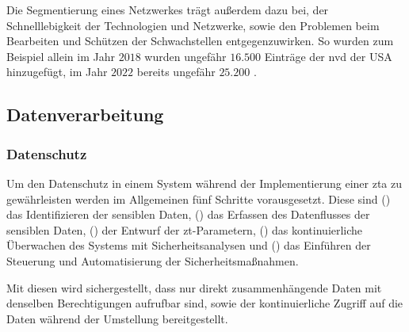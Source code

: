 Die Segmentierung eines Netzwerkes trägt außerdem dazu bei, der Schnelllebigkeit der Technologien und Netzwerke, sowie den Problemen beim Bearbeiten und Schützen der Schwachstellen entgegenzuwirken.
So wurden zum Beispiel allein im Jahr $2018$ wurden ungefähr $16.500$ Einträge der \ac{nvd} der USA hinzugefügt, im Jahr $2022$ bereits ungefähr $25.200$ \autocites[\vglf][]{cunningham-2019}[\vglf][]{cve-2023}.

\subsection{Datenverarbeitung}\label{subsec:datenverarbeitung}
\subsubsection{Datenschutz}\label{subsubsec:datenschutz}
Um den Datenschutz in einem System während der Implementierung einer \ac{zta} zu gewährleisten werden im Allgemeinen fünf Schritte vorausgesetzt.
Diese sind () das Identifizieren der sensiblen Daten, () das Erfassen des Datenflusses der sensiblen Daten, () der Entwurf der \ac{zt}-Parametern, () das kontinuierliche Überwachen des Systems mit Sicherheitsanalysen und () das Einführen der Steuerung und Automatisierung der Sicherheitsmaßnahmen.\autocites[\vglf][-3]{ahmed-2020}[\vglf][]{balaouras-2023}

Mit diesen wird sichergestellt, dass nur direkt zusammenhängende Daten mit denselben Berechtigungen aufrufbar sind, sowie der kontinuierliche Zugriff auf die Daten während der Umstellung bereitgestellt.


